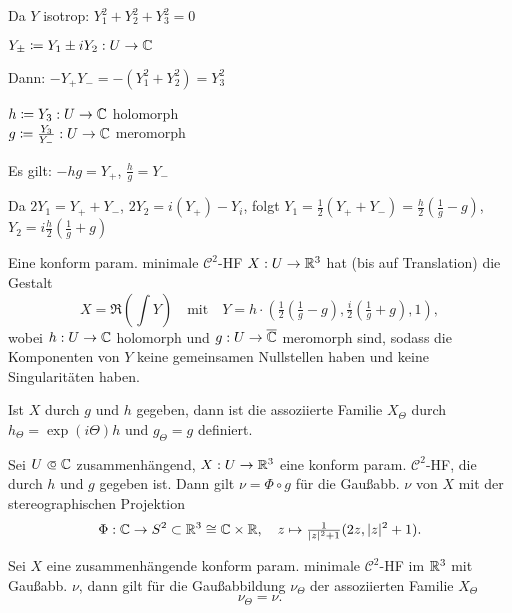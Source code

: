 \documentclass{cheat-sheet}
\begin{document}
  Da $Y$ isotrop: $Y_1^2 + Y_2^2 + Y_3^2 = 0$

  \begin{defn}
    $Y_{\pm} \coloneqq Y_1 \pm i Y_2 : U \to \mathbb{C}$
  \end{defn}

  Dann: $- Y_{+} Y_{-} = - (Y_1^2 + Y_2^2) = Y_3^2$

  \begin{defn}
    $h \coloneqq Y_3 : U \to \mathbb{C}$ holomorph\\
    $g \coloneqq \tfrac{Y_3}{Y_{-}} : U \to \mathbb{C}$ meromorph
  \end{defn}

  Es gilt: $-hg = Y_{+}$, $\tfrac{h}{g} = Y_{-}$


  Da $2 Y_1 = Y_{+} + Y_{-}$, $2 Y_2 = i (Y_{+}) - Y_{i}$, folgt
  $Y_1 = \tfrac{1}{2} (Y_{+} + Y_{-}) = \tfrac{h}{2} (\tfrac{1}{g} - g)$, $Y_2 = i \tfrac{h}{2} (\tfrac{1}{g} + g)$
\fi

\begin{satz}
  Eine konform param. minimale $\mathcal{C}^2$-HF $X : U \to \mathbb{R}^3$ hat (bis auf Translation) die Gestalt
  \[
    X = \Re \left( {\textstyle \int} Y \right)
    \quad \text{mit} \quad
    Y = h \cdot (\tfrac{1}{2} (\tfrac{1}{g} - g), \tfrac{i}{2} (\tfrac{1}{g} + g), 1),
  \]
  wobei $h : U \to \mathbb{C}$ holomorph und $g : U \to \overline{\mathbb{C}}$ meromorph sind, sodass die Komponenten von $Y$ keine gemeinsamen Nullstellen haben und keine Singularitäten haben.
\end{satz}


\begin{beob}
  Ist $X$ durch $g$ und $h$ gegeben, dann ist die assoziierte Familie $X_{\Theta}$ durch $h_{\Theta} = \exp(i \Theta) h$ und $g_{\Theta} = g$ definiert.
\end{beob}

\begin{satz}
  Sei $U \opn \C$ zusammenhängend, $X : U \to \mathbb{R}^3$ eine konform param. $\mathcal{C}^2$-HF, die durch $h$ und $g$ gegeben ist. Dann gilt $\nu = \Phi \circ g$ für die Gaußabb. $\nu$ von $X$ mit der stereographischen Projektion
  \[
    \Phi : \mathbb{C} \to S^2 \subset \mathbb{R}^3 \cong \mathbb{C} \times \mathbb{R}, \quad z \mapsto \tfrac{1}{\lvert z\rvert^2 + 1} (2z, \lvert z\rvert^2 + 1).
  \]
\end{satz}

\begin{kor}
  Sei $X$ eine zusammenhängende konform param. minimale $\mathcal{C}^2$-HF im $\mathbb{R}^3$ mit Gaußabb. $\nu$, dann gilt für die Gaußabbildung $\nu_{\Theta}$ der assoziierten Familie $X_{\Theta}$
  \[ \nu_{\Theta} = \nu. \]
\end{kor}
\end{document}

